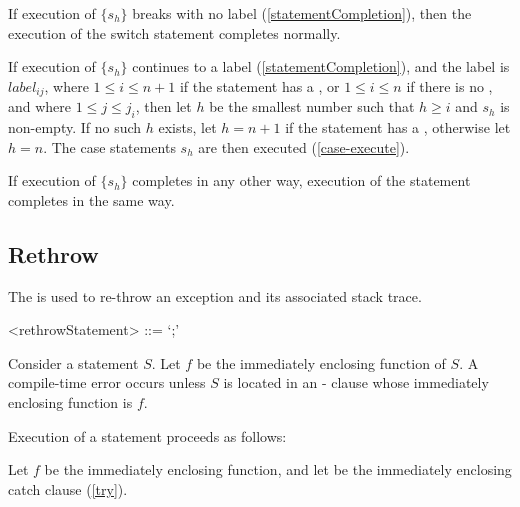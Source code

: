 \documentclass[makeidx]{article}
\begin{document}
{If execution of $\{s_h\}$ breaks with no label (\ref{statementCompletion}),
then the execution of the switch statement completes normally.

If execution of $\{s_h\}$ continues to a label
(\ref{statementCompletion}),
and the label is $label_{ij}$,
where $1 \le i \le n+1$ if the \SWITCH{} statement has a \DEFAULT,
or $1 \le i \le n$ if there is no \DEFAULT,
and where $1 \le j \le j_{i}$,
then let $h$ be the smallest number such that $h \ge i$ and $s_h$ is non-empty.
If no such $h$ exists,
let $h = n + 1$ if the \SWITCH{} statement has a \DEFAULT,
otherwise let $h = n$.
The case statements $s_h$ are then executed (\ref{case-execute}).

If execution of $\{s_h\}$ completes in any other way,
execution of the \SWITCH{} statement completes in the same way.


\subsection{Rethrow}

\LMHash{}%
The  is used to
re-throw an exception and its associated stack trace.

\begin{grammar}
<rethrowStatement> ::= \RETHROW{} `;'
\end{grammar}

\LMHash{}%
Consider a \RETHROW{} statement $S$.
Let $f$ be the immediately enclosing function of $S$.
A compile-time error occurs unless $S$ is located in an \ON-\CATCH{} clause
whose immediately enclosing function is $f$.

\LMHash{}%
Execution of a \code{\RETHROW} statement proceeds as follows:

\LMHash{}%
Let $f$ be the immediately enclosing function,
and let 
be the immediately enclosing catch clause (\ref{try}).


}
\end{document}
